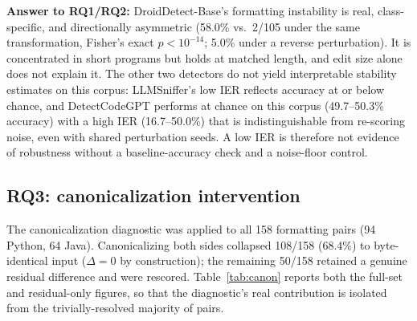 \documentclass[sigconf,review,anonymous]{acmart}
\begin{document}
\par\addvspace{4pt}\noindent\colorbox{shadecolor}{\parbox{\dimexpr\columnwidth-2\fboxsep\relax}{%
\textbf{Answer to RQ1/RQ2:} DroidDetect-Base's formatting instability is real, class-specific, and directionally asymmetric (58.0\% vs.\ 2/105 under the same transformation, Fisher's exact $p{<}10^{-14}$; 5.0\% under a reverse perturbation). It is concentrated in short programs but holds at matched length, and edit size alone does not explain it. The other two detectors do not yield interpretable stability estimates on this corpus: LLMSniffer's low IER reflects accuracy at or below chance, and DetectCodeGPT performs at chance on this corpus (49.7--50.3\% accuracy) with a high IER (16.7--50.0\%) that is indistinguishable from re-scoring noise, even with shared perturbation seeds. A low IER is therefore not evidence of robustness without a baseline-accuracy check and a noise-floor control.
}}\par\addvspace{4pt}


\subsection{RQ3: canonicalization intervention}

The canonicalization diagnostic was applied to all 158 formatting pairs (94 Python, 64 Java). Canonicalizing both sides collapsed 108/158 (68.4\%) to byte-identical input ($\Delta{=}0$ by construction); the remaining 50/158 retained a genuine residual difference and were rescored. Table~\ref{tab:canon} reports both the full-set and residual-only figures, so that the diagnostic's real contribution is isolated from the trivially-resolved majority of pairs.
\end{document}
